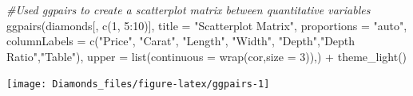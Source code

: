 \documentclass[
]{article}
\newenvironment{Shaded}{\begin{snugshade}}{\end{snugshade}}
\newcommand{\AttributeTok}[1]{\textcolor[rgb]{0.77,0.63,0.00}{#1}}
\newcommand{\CommentTok}[1]{\textcolor[rgb]{0.56,0.35,0.01}{\textit{#1}}}
\newcommand{\DecValTok}[1]{\textcolor[rgb]{0.00,0.00,0.81}{#1}}
\newcommand{\FunctionTok}[1]{\textcolor[rgb]{0.00,0.00,0.00}{#1}}
\newcommand{\NormalTok}[1]{#1}
\newcommand{\SpecialCharTok}[1]{\textcolor[rgb]{0.00,0.00,0.00}{#1}}
\newcommand{\StringTok}[1]{\textcolor[rgb]{0.31,0.60,0.02}{#1}}
\begin{document}
\begin{Shaded}
\begin{Highlighting}[]
\CommentTok{\#Used ggpairs to create a scatterplot matrix between quantitative variables }
\FunctionTok{ggpairs}\NormalTok{(diamonds[, }\FunctionTok{c}\NormalTok{(}\DecValTok{1}\NormalTok{, }\DecValTok{5}\SpecialCharTok{:}\DecValTok{10}\NormalTok{)], }\AttributeTok{title =} \StringTok{"Scatterplot Matrix"}\NormalTok{,}
         \AttributeTok{proportions =} \StringTok{"auto"}\NormalTok{,}
         \AttributeTok{columnLabels =} \FunctionTok{c}\NormalTok{(}\StringTok{"Price"}\NormalTok{, }\StringTok{"Carat"}\NormalTok{, }\StringTok{"Length"}\NormalTok{, }\StringTok{"Width"}\NormalTok{, }\StringTok{"Depth"}\NormalTok{,}\StringTok{"Depth Ratio"}\NormalTok{,}\StringTok{"Table"}\NormalTok{),}
         \AttributeTok{upper =} \FunctionTok{list}\NormalTok{(}\AttributeTok{continuous =} \FunctionTok{wrap}\NormalTok{(}\StringTok{\textquotesingle{}cor\textquotesingle{}}\NormalTok{,}\AttributeTok{size =} \DecValTok{3}\NormalTok{)),) }\SpecialCharTok{+} \FunctionTok{theme\_light}\NormalTok{()}
\end{Highlighting}
\end{Shaded}

\begin{center}\texttt{[image: Diamonds\_files/figure-latex/ggpairs-1]} \end{center}
\end{document}
